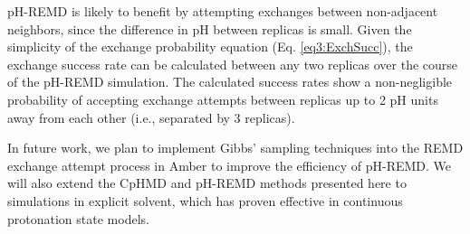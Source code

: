 pH-REMD is likely to benefit by attempting exchanges between non-adjacent
neighbors, since the difference in pH between replicas is small.  Given the
simplicity of the exchange probability equation (Eq. \ref{eq3:ExchSucc}), the
exchange success rate can be calculated between any two replicas over the course
of the pH-REMD simulation.  The calculated success rates show a non-negligible
probability of accepting exchange attempts between replicas up to 2 pH units
away from each other (i.e., separated by 3 replicas).

In future work, we plan to implement Gibbs' sampling techniques
\cite{Chodera_JChemPhys_2011_v135_p194110} into the REMD exchange attempt
process in Amber to improve the efficiency of pH-REMD.  We will also extend the
CpHMD and pH-REMD methods presented here to simulations in explicit solvent,
which has proven effective in continuous protonation state models.
\cite{Wallace_JChemTheoryComput_2011_v7_p2617}
